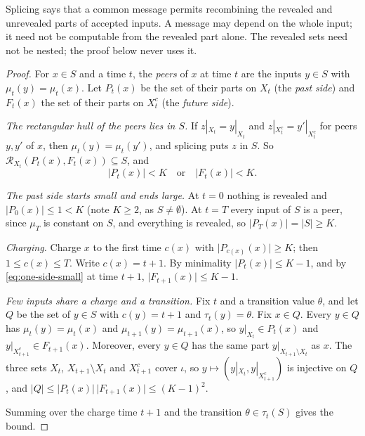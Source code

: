 \documentclass[11pt]{article}
\newcommand{\leanrefs}[1]{{\unskip\nobreak\hfil\penalty50\hskip1em\null\nobreak\hfil
  {\normalfont\small #1}\parfillskip=0pt\finalhyphendemerits=0\par}}
\newcommand{\leanref}[1]{\leanrefs{\lean{#1}}}
\theoremstyle{plain}
\theoremstyle{definition}
\theoremstyle{remark}
\newcommand{\rect}{\mathcal{R}}
\newcommand{\restr}[2]{#1|_{#2}}
\newcommand{\card}[1]{\lvert #1\rvert}
\begin{document}
Splicing says that a common message permits recombining the revealed and unrevealed parts of
accepted inputs. A message may depend on the whole input; it need not be computable from the
revealed part alone. The revealed sets need not be nested; the proof below never uses it.


\begin{proof}
For $x \in S$ and a time $t$, the \emph{peers} of $x$ at time $t$ are the inputs $y \in S$ with
$\mu_t(y) = \mu_t(x)$. Let $P_t(x)$ be the set of their parts on $X_t$ (the \emph{past side})
and $F_t(x)$ the set of their parts on $X_t^c$ (the \emph{future side}).

\emph{The rectangular hull of the peers lies in $S$.} If $\restr{z}{X_t} = \restr{y}{X_t}$ and
$\restr{z}{X_t^c} = \restr{y'}{X_t^c}$ for peers $y, y'$ of $x$, then $\mu_t(y) = \mu_t(y')$, and
splicing puts $z$ in $S$. So $\rect_{X_t}(P_t(x), F_t(x)) \subseteq S$, and
\begin{equation}
\label{eq:one-side-small}
  \card{P_t(x)} < K \quad\text{or}\quad \card{F_t(x)} < K .
\end{equation}

\emph{The past side starts small and ends large.} At $t = 0$ nothing is revealed and
$\card{P_0(x)} \le 1 < K$ (note $K \ge 2$, as $S \ne \emptyset$). At $t = T$ every input of
$S$ is a peer, since $\mu_T$ is constant on $S$, and everything is revealed, so
$\card{P_T(x)} = \card S \ge K$.

\emph{Charging.} Charge $x$ to the first time $c(x)$ with $\card{P_{c(x)}(x)} \ge K$; then
$1 \le c(x) \le T$. Write $c(x) = t + 1$. By minimality $\card{P_t(x)} \le K - 1$, and by
\eqref{eq:one-side-small} at time $t+1$, $\card{F_{t+1}(x)} \le K - 1$.

\emph{Few inputs share a charge and a transition.} Fix $t$ and a transition value $\theta$, and
let $Q$ be the set of $y \in S$ with $c(y) = t+1$ and $\tau_t(y) = \theta$. Fix $x \in Q$. Every
$y \in Q$ has $\mu_t(y) = \mu_t(x)$ and $\mu_{t+1}(y) = \mu_{t+1}(x)$, so
$\restr{y}{X_t} \in P_t(x)$ and $\restr{y}{X_{t+1}^c} \in F_{t+1}(x)$. Moreover, every
$y \in Q$ has the same part $\restr{y}{X_{t+1} \setminus X_t}$ as $x$. The three sets
$X_t$, $X_{t+1} \setminus X_t$ and $X_{t+1}^c$ cover $\iota$, so
$y \mapsto (\restr{y}{X_t}, \restr{y}{X_{t+1}^c})$ is injective on $Q$, and
$\card Q \le \card{P_t(x)}\,\card{F_{t+1}(x)} \le (K-1)^2$.

Summing over the charge time $t+1$ and the transition $\theta \in \tau_t(S)$ gives the bound.
\end{proof}
\end{document}
